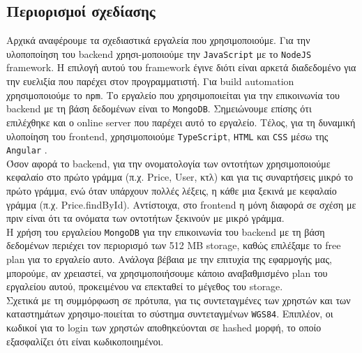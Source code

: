 
\subsection{Περιορισμοί σχεδίασης}

Αρχικά αναφέρουμε τα σχεδιαστικά εργαλεία που χρησιμοποιούμε. Για την υλοποποίηση του backend χρησι-μοποιούμε την \texttt{JavaScript} με το \texttt{NodeJS} framework. Η επιλογή αυτού του framework έγινε διότι είναι αρκετά διαδεδομένο για την ευελιξία που παρέχει στον προγραμματιστή. Για build automation χρησιμοποιούμε το \texttt{npm}. Το εργαλείο που χρησιμοποιείται για την επικοινωνία του backend με τη βάση δεδομένων είναι το \texttt{MongoDB}. Σημειώνουμε επίσης ότι επιλέχθηκε και ο online server που παρέχει αυτό το εργαλείο. Τέλος, για τη δυναμική υλοποίηση του frontend, χρησιμοποιούμε \texttt{TypeScript}, \texttt{HTML} και \texttt{CSS} μέσω της \texttt{Angular} .\\
Όσον αφορά το backend, για την ονοματολογία των οντοτήτων χρησιμοποιούμε κεφαλαίο στο πρώτο γράμμα (π.χ. Price, User, κτλ) και για τις συναρτήσεις μικρό το πρώτο γράμμα, ενώ όταν υπάρχουν πολλές λέξεις, η κάθε μια ξεκινά με κεφαλαίο γράμμα (π.χ. Price.findById).
Αντίστοιχα, στο frontend η μόνη διαφορά σε σχέση με πριν είναι ότι τα ονόματα των οντοτήτων ξεκινούν με μικρό γράμμα. \\
Η χρήση του εργαλείου \texttt{MongoDB} για την επικοινωνία του backend με τη βάση δεδομένων περιέχει τον περιορισμό των 512 MB storage, καθώς επιλέξαμε το free plan για το εργαλείο αυτο. Ανάλογα βέβαια με την επιτυχία της εφαρμογής μας, μπορούμε, αν χρειαστεί, να χρησιμοποιήσουμε κάποιο αναβαθμισμένο plan του εργαλείου αυτού, προκειμένου να επεκταθεί το μέγεθος του storage. \\
Σχετικά με τη συμμόρφωση σε πρότυπα, για τις συντεταγμένες των χρηστών και των καταστημάτων χρησιμο-ποιείται το σύστημα συντεταγμένων \texttt{WGS84}. Επιπλέον, οι κωδικοί για το login των χρηστών αποθηκεύονται σε hashed μορφή, το οποίο εξασφαλίζει ότι είναι κωδικοποιημένοι.